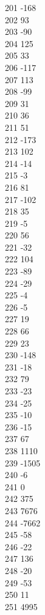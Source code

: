 { 201	-168 \\
 202	93 \\
 203	-90 \\
 204	125 \\
 205	33 \\
 206	-117 \\
 207	113 \\
 208	-99 \\
 209	31 \\
 210	36 \\
 211	51 \\
 212	-173 \\
 213	102 \\
 214	-14 \\
 215	-3 \\
 216	81 \\
 217	-102 \\
 218	35 \\
 219	-5 \\
 220	56 \\
 221	-32 \\
 222	104 \\
 223	-89 \\
 224	-29 \\
 225	-4 \\
 226	-5 \\
 227	19 \\
 228	66 \\
 229	23 \\
 230	-148 \\
 231	-18 \\
 232	79 \\
 233	-23 \\
 234	-25 \\
 235	-10 \\
 236	-15 \\
 237	67 \\
 238	1110 \\
 239	-1505 \\
 240	-6 \\
 241	0 \\
 242	375 \\
 243	7676 \\
 244	-7662 \\
 245	-58 \\
 246	-22 \\
 247	136 \\
 248	-20 \\
 249	-53 \\
 250	11 \\
 251	4995 \\
}

